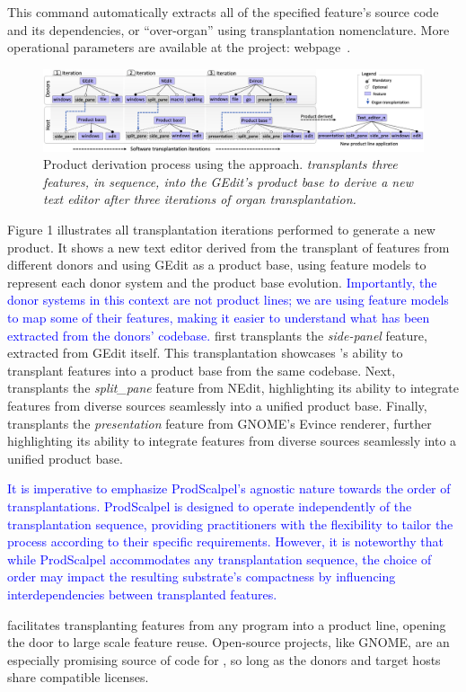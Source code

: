 This command automatically extracts all of the specified feature's source code and its dependencies, or “over-organ” using transplantation nomenclature. More operational parameters are available at the project: webpage~\cite{ProjectWebpage}.

 \begin{figure}[t]
	\centering \includegraphics[width=\textwidth]{images/incremental_ST4.png}
	\caption{Product derivation process using the \FOUNDRY approach. \textit{\prodscalpel transplants three features, in sequence, into the GEdit's product base to derive a new text editor after three iterations of organ transplantation.} }
	\label{fig:incremental_pd}
\end{figure} 

Figure 1 illustrates all transplantation iterations performed to generate a new product. It shows a new text editor derived from the transplant of features from different donors and using GEdit as a product base, using feature models to represent each donor system and the product base evolution. \textcolor{blue}{Importantly, the donor systems in this context are not product lines; we are using feature models to map some of their features, making it easier to understand what has been extracted from the donors' codebase.} \prodscalpel first transplants the \emph{side-panel} feature, extracted from GEdit itself. This transplantation showcases \prodscalpel's ability to transplant features into a product base from the same codebase. Next, \prodscalpel transplants the \emph{split\_pane} feature from NEdit, highlighting its ability to integrate features from diverse sources seamlessly into a unified product base. Finally, \prodscalpel transplants the \emph{presentation} feature from GNOME's Evince renderer, further highlighting its ability to integrate features from diverse sources seamlessly into a unified product base.

\textcolor{blue}{It is imperative to emphasize ProdScalpel's agnostic nature towards the order of transplantations. ProdScalpel is designed to operate independently of the transplantation sequence, providing practitioners with the flexibility to tailor the process according to their specific requirements.  However, it is noteworthy that while ProdScalpel accommodates any transplantation sequence, the choice of order may impact the resulting substrate's compactness by influencing interdependencies between transplanted features. }

\FOUNDRY facilitates transplanting features from any program into a product line, opening the door to large scale feature reuse. Open-source projects, like GNOME, are an especially promising source of code for \FOUNDRY, so long as the donors and target hosts share compatible licenses.

